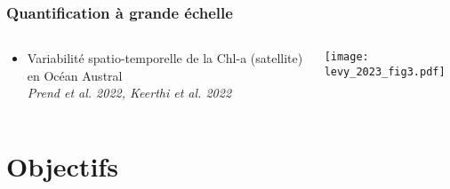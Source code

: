 \documentclass[11pt, french, aspectratio=32]{beamer}
\begin{document}

\endgroup


\begin{frame}
  \frametitle{Quantification à grande échelle}
  \begin{columns}
    \begin{column}{0.66\linewidth}
      \begin{itemize}
        \item Variabilité spatio-temporelle de la Chl-a (satellite) en Océan Austral
              \\
              {\footnotesize\textit{Prend et al. 2022, Keerthi et al. 2022}}
      \end{itemize}
    \end{column}
    \begin{column}{0.33\linewidth}
      \texttt{[image: levy\_2023\_fig3.pdf]}
    \end{column}
  \end{columns}

  \vspace*{2em}

\end{frame}


\section{Objectifs}
\end{document}
